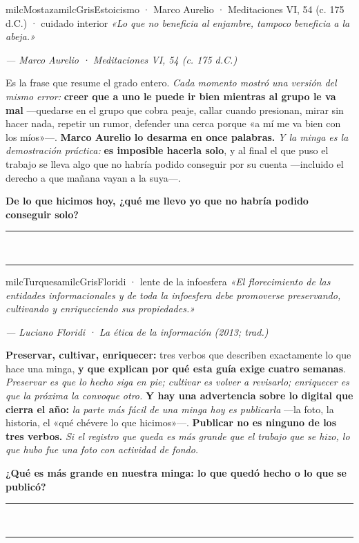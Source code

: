 \documentclass[11pt,letterpaper]{article}
\newcommand{\linead}[1]{\noindent\color{milcLinea}\rule{#1}{0.5pt}\color{milcNegro}}
\begin{document}
\begin{softbox}{milcMostaza}{milcGris}{Estoicismo · Marco Aurelio · Meditaciones VI, 54 (c. 175 d.C.) · cuidado interior}
\textit{«Lo que no beneficia al enjambre, tampoco beneficia a la abeja.»}

{\footnotesize\itshape\color{milcNegro!70}--- Marco Aurelio · Meditaciones VI, 54 (c. 175 d.C.)}

Es la frase que resume el grado entero. \emph{Cada momento mostró una versión del mismo error:} \textbf{creer que a uno le puede ir bien mientras al grupo le va mal} ---quedarse en el grupo que cobra peaje, callar cuando presionan, mirar sin hacer nada, repetir un rumor, defender una cerca porque «a mí me va bien con los míos»---. \textbf{Marco Aurelio lo desarma en once palabras.} \emph{Y la minga es la demostración práctica:} \textbf{es imposible hacerla solo}, y al final el que puso el trabajo se lleva algo que no habría podido conseguir por su cuenta ---incluido el derecho a que mañana vayan a la suya---.

\textbf{De lo que hicimos hoy, ¿qué me llevo yo que no habría podido conseguir solo?}
\end{softbox}
\linead{\linewidth}\\[1mm]
\linead{\linewidth}

\begin{softbox}{milcTurquesa}{milcGris}{Floridi · lente de la infoesfera}
\textit{«El florecimiento de las entidades informacionales y de toda la infoesfera debe promoverse preservando, cultivando y enriqueciendo sus propiedades.»}

{\footnotesize\itshape\color{milcNegro!70}--- Luciano Floridi · La ética de la información (2013; trad.)}

\textbf{Preservar, cultivar, enriquecer:} tres verbos que describen exactamente lo que hace una minga, \textbf{y que explican por qué esta guía exige cuatro semanas}. \emph{Preservar es que lo hecho siga en pie; cultivar es volver a revisarlo; enriquecer es que la próxima la convoque otro.} \textbf{Y hay una advertencia sobre lo digital que cierra el año:} \emph{la parte más fácil de una minga hoy es publicarla} ---la foto, la historia, el «qué chévere lo que hicimos»---. \textbf{Publicar no es ninguno de los tres verbos.} \emph{Si el registro que queda es más grande que el trabajo que se hizo, lo que hubo fue una foto con actividad de fondo.}

\textbf{¿Qué es más grande en nuestra minga: lo que quedó hecho o lo que se publicó?}
\end{softbox}
\linead{\linewidth}\\[1mm]
\linead{\linewidth}
\end{document}
